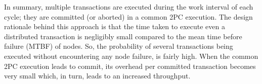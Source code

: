 %
%
%
In summary, multiple transactions are executed during the work interval of each cycle; they are committed (or aborted) in a common 2PC execution. The design rationale behind this approach is that
the time taken to execute even a distributed transaction is negligibly small compared to the mean time before failure (MTBF) of nodes. So, 
the probability of several transactions being executed without encountering any node failure, is fairly high. 
When the common 2PC execution leads to commit, its overhead per committed transaction becomes very small 
which, in turn, leads to an increased throughput. 

